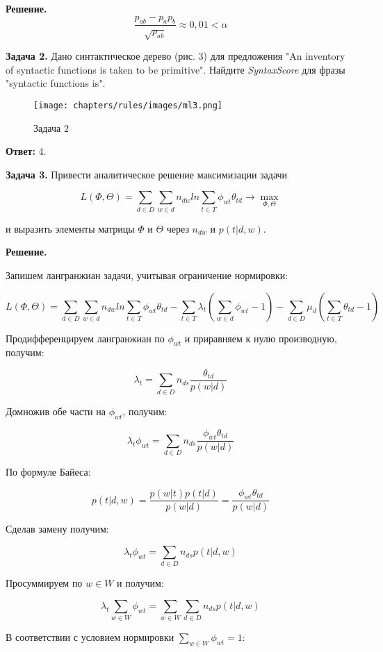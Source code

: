 \textbf{Решение.} 
$$\frac{p_{ab}-p_{a}p_{b}}{\sqrt{p_{ab}}} \approx 0,01 < \alpha$$

 \textbf{Задача 2.} Дано синтактическое дерево (рис. 3) для предложения "An inventory of syntactic functions is taken to be primitive". Найдите \textit{SyntaxScore} для фразы "syntactic functions is".
 
\begin{figure}
    \texttt{[image: chapters/rules/images/ml3.png]}
    \caption{Задача 2}
\end{figure}

\textbf{Ответ:} 4.

\textbf{Задача 3.} Привести аналитическое решение максимизации задачи

$$L(\Phi, \Theta) = \sum_{d \in D} \sum_{w \in d} n_{dw} ln \sum_{t \in T} \phi_{wt} \theta_{td} \rightarrow \max_{\Phi, \Theta}$$

и выразить элементы матрицы $\Phi$ и $\Theta$ через $n_{dw}$ и $p(t|d,w)$.

\textbf{Решение.}

Запишем лангранжиан задачи, учитывая ограничение нормировки:

$$L(\Phi, \Theta) = \sum_{d \in D} \sum_{w \in d} n_{dw} ln \sum_{t \in T} \phi_{wt} \theta_{td} - \sum_{t \in T} \lambda_{t} (\sum_{w \in d} \phi_{wt} - 1) - \sum_{d \in D} \mu_{d} (\sum_{t \in T} \theta_{td} - 1)$$

Продифференцируем лангранжиан по $\phi_{wt}$ и приравняем к нулю производную, получим:

$$\lambda_{t} = \sum_{d \in D} n_{ds} \frac{\theta_{td}}{p(w|d)}$$

Домножив обе части на $\phi_{wt}$, получим:

$$\lambda_{t} \phi_{wt} = \sum_{d \in D} n_{ds} \frac{\phi_{wt} \theta_{td}}{p(w|d)}$$

По формуле Байеса:

$$p(t|d,w) = \frac{p(w|t) p(t|d)}{p(w|d)} = \frac{\phi_{wt} \theta_{td}}{p(w|d)}$$

Сделав замену  получим:

$$\lambda_{t} \phi_{wt} = \sum_{d \in D} n_{ds} p(t|d,w)$$

Просуммируем по $w \in W$ и получим:

$$\lambda_{t} \sum_{w \in W} \phi_{wt} = \sum_{w \in W} \sum_{d \in D} n_{ds} p(t|d,w)$$

В соответствии с условием нормировки $\sum_{w \in W} \phi_{wt} = 1$:

